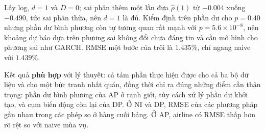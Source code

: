  Lấy log, $d=1$ và $D=0$; sai phân thêm một lần đưa $\hat\rho(1)$ từ $-0.004$ xuống $-0.490$, tức sai phân thừa, nên $d=1$ là đủ. Kiểm định trên phần dư cho $p=0.40$ nhưng phần dư bình phương còn tự tương quan rất mạnh với $p=5.6\times10^{-8}$, nên khoảng dự báo dựa trên phương sai không đổi chưa đáng tin và cần mô hình cho phương sai như GARCH. RMSE một bước của trôi là $1.435\%$, chỉ ngang naive với $1.439\%$.

 Kết quả \textbf{phù hợp} với lý thuyết: cả tám phần thực hiện được cho cả ba bộ dữ liệu và cho một bức tranh nhất quán, đồng thời chỉ ra đúng những điểm cần thận trọng: phần dư bình phương của AP ở ranh giới, tùy cách xử lý phần dư khởi tạo, và cụm biến động còn lại của DP. Ở NI và DP, RMSE của các phương pháp gần nhau trong các phép so ở hàng cuối bảng. Ở AP, airline có RMSE thấp hơn rõ rệt so với naive mùa vụ.
